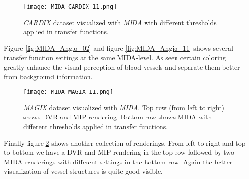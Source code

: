 \begin{figure}[h]
	\centering
	\texttt{[image: MIDA\_CARDIX\_11.png]} \\
	\caption{ \emph{CARDIX}\cite{gimias_sampledata_2018} dataset visualized with \emph{MIDA} with different thresholds applied in transfer functions.}
	\label{fig:MIDA_CARDIX_11}
\end{figure}


Figure \ref{fig:MIDA_Angio_02} %
and figure \ref{fig:MIDA_Angio_11} shows several transfer function settings at the same MIDA-level. As seen certain coloring greatly enhance the visual perception of blood vessels and separate them better from background information.

\begin{figure}[h]
	\centering
	\texttt{[image: MIDA\_MAGIX\_11.png]} \\
	\caption{ \emph{MAGIX}\cite{gimias_sampledata_2018} dataset visualized with \emph{MIDA}. Top row (from left to right) shows DVR and MIP rendering. Bottom row shows MIDA with different thresholds applied in transfer functions.}
	\label{fig:MIDA_MAGIX_11}
\end{figure}

Finally figure \ref{fig:MIDA_MAGIX_11} shows another collection of renderings. From left to right and top to bottom we have a DVR and MIP rendering in the top row followed by two MIDA renderings with different settings in the bottom row. Again the better visualization of vessel structures is quite good visible.
